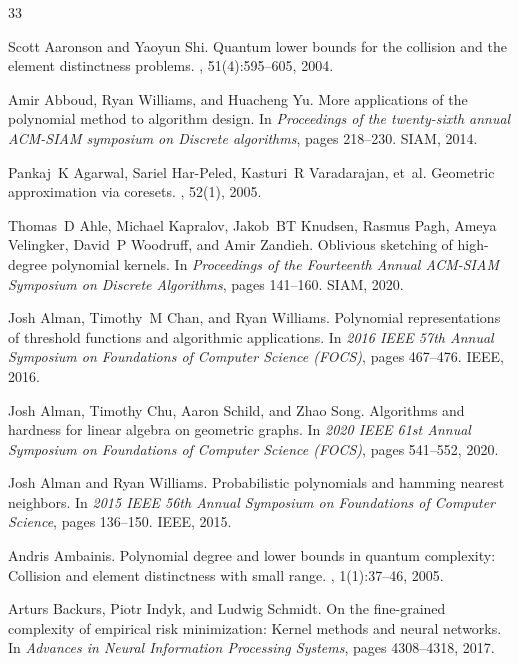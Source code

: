 \begin{thebibliography}{33}

Scott Aaronson and Yaoyun Shi.
\newblock Quantum lower bounds for the collision and the element distinctness
  problems.
, 51(4):595--605, 2004.

Amir Abboud, Ryan Williams, and Huacheng Yu.
\newblock More applications of the polynomial method to algorithm design.
\newblock In {\em Proceedings of the twenty-sixth annual ACM-SIAM symposium on
  Discrete algorithms}, pages 218--230. SIAM, 2014.

Pankaj~K Agarwal, Sariel Har-Peled, Kasturi~R Varadarajan, et~al.
\newblock Geometric approximation via coresets.
, 52(1), 2005.

Thomas~D Ahle, Michael Kapralov, Jakob~BT Knudsen, Rasmus Pagh, Ameya
  Velingker, David~P Woodruff, and Amir Zandieh.
\newblock Oblivious sketching of high-degree polynomial kernels.
\newblock In {\em Proceedings of the Fourteenth Annual ACM-SIAM Symposium on
  Discrete Algorithms}, pages 141--160. SIAM, 2020.

Josh Alman, Timothy~M Chan, and Ryan Williams.
\newblock Polynomial representations of threshold functions and algorithmic
  applications.
\newblock In {\em 2016 IEEE 57th Annual Symposium on Foundations of Computer
  Science (FOCS)}, pages 467--476. IEEE, 2016.

Josh Alman, Timothy Chu, Aaron Schild, and Zhao Song.
\newblock Algorithms and hardness for linear algebra on geometric graphs.
\newblock In {\em 2020 IEEE 61st Annual Symposium on Foundations of Computer
  Science (FOCS)}, pages 541--552, 2020.

Josh Alman and Ryan Williams.
\newblock Probabilistic polynomials and hamming nearest neighbors.
\newblock In {\em 2015 IEEE 56th Annual Symposium on Foundations of Computer
  Science}, pages 136--150. IEEE, 2015.

Andris Ambainis.
\newblock Polynomial degree and lower bounds in quantum complexity: Collision
  and element distinctness with small range.
, 1(1):37--46, 2005.

Arturs Backurs, Piotr Indyk, and Ludwig Schmidt.
\newblock On the fine-grained complexity of empirical risk minimization: Kernel
  methods and neural networks.
\newblock In {\em Advances in Neural Information Processing Systems}, pages
  4308--4318, 2017.


\end{thebibliography}
